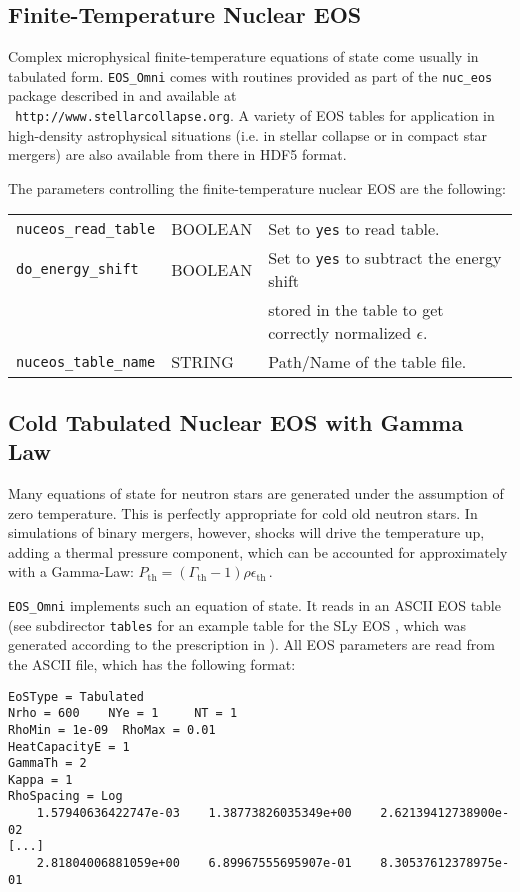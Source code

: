 \subsection{Finite-Temperature Nuclear EOS}

Complex microphysical finite-temperature equations of state come
usually in tabulated form. {\tt EOS\_Omni} comes with routines
provided as part of the \texttt{nuc\_eos} package described in
\cite{oconnor:10} and available at \\ {\tt
  http://www.stellarcollapse.org}. A variety of EOS tables for
application in high-density astrophysical situations (i.e. in stellar
collapse or in compact star mergers) are also available from there
in HDF5 format.

The parameters controlling the finite-temperature nuclear EOS
are the following:

\begin{tabular}{lll}
\texttt{nuceos\_read\_table}& BOOLEAN & Set to {\tt yes} to read table.\\
\texttt{do\_energy\_shift}& BOOLEAN & Set to {\tt yes} to subtract the energy shift\\ 
&& stored in the table to get correctly normalized $\epsilon$.\\
\texttt{nuceos\_table\_name}& STRING & Path/Name of the table file.
\end{tabular}

\subsection{Cold Tabulated Nuclear EOS with Gamma Law}

Many equations of state for neutron stars are generated under the
assumption of zero temperature. This is perfectly appropriate for cold
old neutron stars. In simulations of binary mergers, however, shocks
will drive the temperature up, adding a thermal pressure component,
which can be accounted for approximately with a Gamma-Law:
$P_\mathrm{th} = (\Gamma_\mathrm{th} - 1)\rho\epsilon_\mathrm{th}$\,.

{\tt EOS\_Omni} implements such an equation of state. It reads in an
ASCII EOS table (see subdirector {\tt tables} for an example table for
the SLy EOS \cite{douchin:01,haensel:04}, which was generated
according to the prescription in \cite{shibata:05,corvino:10}). All
EOS parameters are read from the ASCII file, which has the following
format:

\begin{verbatim}
EoSType = Tabulated
Nrho = 600    NYe = 1     NT = 1
RhoMin = 1e-09  RhoMax = 0.01
HeatCapacityE = 1
GammaTh = 2
Kappa = 1
RhoSpacing = Log
    1.57940636422747e-03    1.38773826035349e+00    2.62139412738900e-02
[...]
    2.81804006881059e+00    6.89967555695907e-01    8.30537612378975e-01
\end{verbatim}


